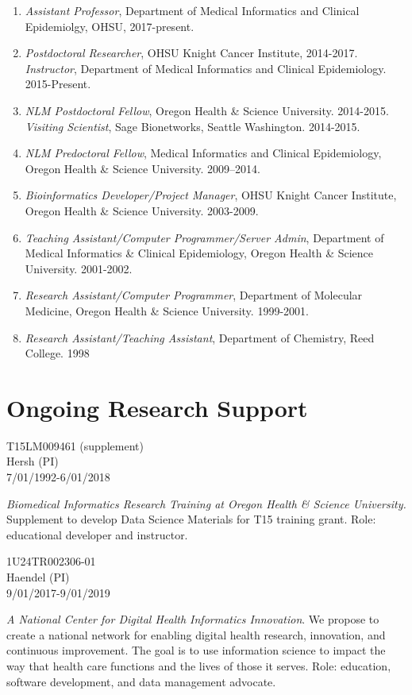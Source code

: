 \documentclass[11pt,]{article}
\begin{document}
\begin{enumerate}
\def\labelenumi{\arabic{enumi}.}
\item
  \emph{Assistant Professor}, Department of Medical Informatics and
  Clinical Epidemiolgy, OHSU, 2017-present.
\item
  \emph{Postdoctoral Researcher}, OHSU Knight Cancer Institute,
  2014-2017. \emph{Instructor}, Department of Medical Informatics and
  Clinical Epidemiology. 2015-Present.
\item
  \emph{NLM Postdoctoral Fellow}, Oregon Health \& Science University.
  2014-2015.\\
  \emph{Visiting Scientist}, Sage Bionetworks, Seattle Washington.
  2014-2015.
\item
  \emph{NLM Predoctoral Fellow}, Medical Informatics and Clinical
  Epidemiology, Oregon Health \& Science University. 2009--2014.
\item
  \emph{Bioinformatics Developer/Project Manager}, OHSU Knight Cancer
  Institute, Oregon Health \& Science University. 2003-2009.
\item
  \emph{Teaching Assistant/Computer Programmer/Server Admin}, Department
  of Medical Informatics \& Clinical Epidemiology, Oregon Health \&
  Science University. 2001-2002.
\item
  \emph{Research Assistant/Computer Programmer}, Department of Molecular
  Medicine, Oregon Health \& Science University. 1999-2001.
\item
  \emph{Research Assistant/Teaching Assistant}, Department of Chemistry,
  Reed College. 1998
\end{enumerate}

\section{Ongoing Research Support}\label{ongoing-research-support}

T15LM009461 (supplement)\\
Hersh (PI)\\
7/01/1992-6/01/2018

\emph{Biomedical Informatics Research Training at Oregon Health \&
Science University.} Supplement to develop Data Science Materials for
T15 training grant. Role: educational developer and instructor.

1U24TR002306-01\\
Haendel (PI)\\
9/01/2017-9/01/2019

\emph{A National Center for Digital Health Informatics Innovation}. We
propose to create a national network for enabling digital health
research, innovation, and continuous improvement. The goal is to use
information science to impact the way that health care functions and the
lives of those it serves. Role: education, software development, and
data management advocate.
\end{document}
